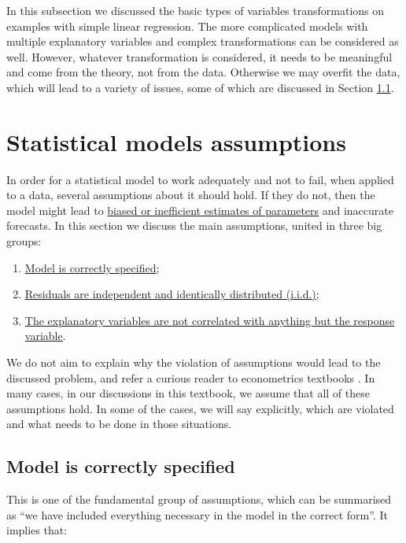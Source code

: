 \documentclass[
]{book}
\providecommand{\tightlist}{%
  \setlength{\itemsep}{0pt}\setlength{\parskip}{0pt}}
\theoremstyle{definition}
\theoremstyle{definition}
\theoremstyle{definition}
\theoremstyle{definition}
\theoremstyle{remark}
\begin{document}
In this subsection we discussed the basic types of variables transformations on examples with simple linear regression. The more complicated models with multiple explanatory variables and complex transformations can be considered as well. However, whatever transformation is considered, it needs to be meaningful and come from the theory, not from the data. Otherwise we may overfit the data, which will lead to a variety of issues, some of which are discussed in Section \ref{assumptionsCorrectModel}.

\chapter{Statistical models assumptions}\label{assumptions}

In order for a statistical model to work adequately and not to fail, when applied to a data, several assumptions about it should hold. If they do not, then the model might lead to \hyperref[estimatesProperties]{biased or inefficient estimates of parameters} and inaccurate forecasts. In this section we discuss the main assumptions, united in three big groups:

\begin{enumerate}
\def\labelenumi{\arabic{enumi}.}
\tightlist
\item
  \hyperref[assumptionsCorrectModel]{Model is correctly specified};
\item
  \hyperref[assumptionsResidualsAreIID]{Residuals are independent and identically distributed (i.i.d.)};
\item
  \hyperref[assumptionsXreg]{The explanatory variables are not correlated with anything but the response variable}.
\end{enumerate}

We do not aim to explain why the violation of assumptions would lead to the discussed problem, and refer a curious reader to econometrics textbooks \citep[for example][]{Hanck2020}. In many cases, in our discussions in this textbook, we assume that all of these assumptions hold. In some of the cases, we will say explicitly, which are violated and what needs to be done in those situations.

\section{Model is correctly specified}\label{assumptionsCorrectModel}

This is one of the fundamental group of assumptions, which can be summarised as ``we have included everything necessary in the model in the correct form''. It implies that:
\end{document}
